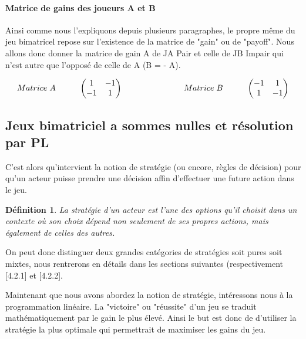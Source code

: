 \documentclass[a4paper, 12pt, twoside]{article}
\newtheorem{definition}{Définition}
\begin{document}
{\paragraph{Matrice de gains des joueurs A et B}{Ainsi comme nous l'expliquons depuis plusieurs paragraphes, le propre même du jeu bimatricel repose sur l'existence de la matrice de "gain" ou de "payoff".  Nous allons donc donner la matrice de gain A de JA \textsf{Pair} et celle de JB \textsf{Impair} qui n'est autre que l'opposé de celle de  A (B = - A).}

\[
Matrice\hspace{0,1cm} A\hspace{1cm}
\begin{pmatrix}1&-1\\
-1&1\\
\end{pmatrix}\                      \hspace{2,5cm}  
Matrice\hspace{0,1cm} B \hspace{1cm}  
\begin{pmatrix}-1&1\\
1&-1\\
\end{pmatrix} 
\]

\subsection{Jeux bimatriciel a sommes nulles et résolution par PL}

C'est alors qu'intervient la notion de \textsf{stratégie} (ou encore, règles de décision) pour  qu'un acteur puisse prendre une décision affin d'effectuer une future action dans le jeu.\newline
\begin{definition}
La stratégie d’un acteur est l’une des options qu’il choisit dans un contexte où son choix dépend non seulement de ses propres actions, mais également de celles des autres.
\end{definition}

On peut donc distinguer deux grandes catégories de \textsf{stratégies} soit pures soit mixtes, nous rentrerons en détails dans les sections suivantes (respectivement [4.2.1] et [4.2.2]. \newline

Maintenant que nous avons abordez la notion de stratégie, intéressons nous à la programmation linéaire. La "victoire" ou "réussite" d'un jeu se traduit mathématiquement par le \textsf{gain} le plus élevé. Ainsi le but est donc de d'utiliser la stratégie la plus optimale qui permettrait de maximiser les \textsf{gains} du jeu.

}
\end{document}
